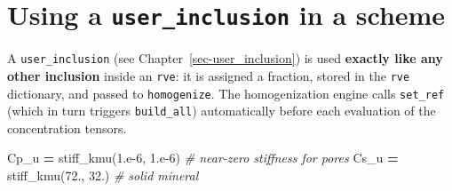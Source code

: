 \documentclass[
  a4paper,
  numbers=noendperiod,
  DIV=12]{scrreprt}
\newenvironment{Shaded}{\begin{snugshade}}{\end{snugshade}}
\newcommand{\CommentTok}[1]{\textcolor[rgb]{0.56,0.35,0.01}{\textit{#1}}}
\newcommand{\FloatTok}[1]{\textcolor[rgb]{0.00,0.00,0.81}{#1}}
\newcommand{\NormalTok}[1]{#1}
\newcommand{\OperatorTok}[1]{\textcolor[rgb]{0.81,0.36,0.00}{\textbf{#1}}}
\begin{document}
\section{\texorpdfstring{Using a \texttt{user\_inclusion} in a
scheme}{Using a user\_inclusion in a scheme}}\label{sec-user-in-scheme}

A \texttt{user\_inclusion} (see Chapter~\ref{sec-user_inclusion}) is
used \textbf{exactly like any other inclusion} inside an \texttt{rve}:
it is assigned a fraction, stored in the \texttt{rve} dictionary, and
passed to \texttt{homogenize}. The homogenization engine calls
\texttt{set\_ref} (which in turn triggers \texttt{build\_all})
automatically before each evaluation of the concentration tensors.

\begin{Shaded}
\begin{Highlighting}[]
\NormalTok{Cp\_u }\OperatorTok{=}\NormalTok{ stiff\_kmu(}\FloatTok{1.e{-}6}\NormalTok{, }\FloatTok{1.e{-}6}\NormalTok{)   }\CommentTok{\# near{-}zero stiffness for pores}
\NormalTok{Cs\_u }\OperatorTok{=}\NormalTok{ stiff\_kmu(}\FloatTok{72.}\NormalTok{, }\FloatTok{32.}\NormalTok{)        }\CommentTok{\# solid mineral}


\end{Highlighting}
\end{Shaded}
\end{document}
